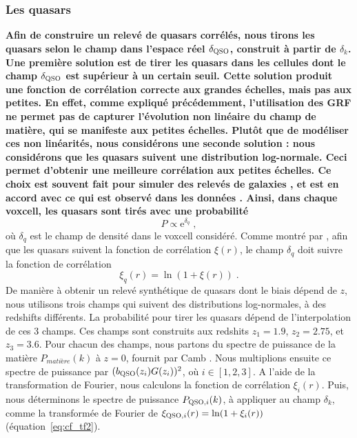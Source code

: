 \documentclass[11pt, twoside, a4paper, openright]{report}
\begin{document}
\subsubsection{Les quasars}
\textbf{Afin de construire un relevé de quasars corrélés, nous tirons les quasars selon le champ dans l'espace réel $\delta_{\textsc{QSO}}$, construit à partir de $\delta_k$. Une première solution est de tirer les quasars dans les cellules dont le champ $\delta_{\textsc{QSO}}$ est supérieur à un certain seuil. Cette solution produit une fonction de corrélation correcte aux grandes échelles, mais pas aux petites.
En effet, comme expliqué précédemment, l'utilisation des GRF ne permet pas de capturer l'évolution non linéaire du champ de matière, qui se manifeste aux petites échelles.
Plutôt que de modéliser ces non linéarités, nous considérons une seconde solution : nous considérons que les quasars suivent une distribution log-normale. Ceci permet d'obtenir une meilleure corrélation aux petites échelles.
Ce choix est souvent fait pour simuler des relevés de galaxies \citep{agrawal_generating_2017}, et est en accord avec ce qui est observé dans les données \citep{Clerkin2016}.
Ainsi, dans chaque voxcell, les quasars sont tirés avec une probabilité}
\begin{equation}
  P \propto \mathrm{e}^{\delta_q} \; ,
\end{equation}
où $\delta_q$ est le champ de densité dans le voxcell considéré.
Comme montré par \citet{coles_lognormal_1991}, afin que les quasars suivent la fonction de corrélation $\xi(r)$, le champ $\delta_q$ doit suivre la fonction de corrélation 
\begin{equation}
  \label{eq:lognormal}
  \xi_q(r) = \ln(1+\xi(r)) \; .
\end{equation}
De manière à obtenir un relevé synthétique de quasars dont le biais dépend de $z$, nous utilisons trois champs qui suivent des distributions log-normales, à des redshifts différents. La probabilité pour tirer les quasars dépend de l'interpolation de ces 3 champs. Ces champs sont construits aux redshits $z_1 = \num{1.9}$, $z_2 = \num{2.75}$, et $z_3 = \num{3.6}$. Pour chacun des champs, nous partons du spectre de puissance de la matière $P_{matière}(k)$ à $z=0$, fournit par Camb \citep{Lewis1999}. Nous multiplions ensuite ce spectre de puissance par $(b_{\textsc{QSO}}(z_i) G(z_i))^2$, où $i \in [1, 2, 3]$. A l'aide de la transformation de Fourier, nous calculons la fonction de corrélation $\xi_{i}(r)$. Puis, nous déterminons le spectre de puissance $P_{\textsc{QSO},i}(k)$, à appliquer au champ $\delta_k$, comme la transformée de Fourier de $\xi_{\textsc{QSO},i}(r) = \ln(1+\xi_i(r))$ (équation~\ref{eq:cf_tf2}).
\end{document}
